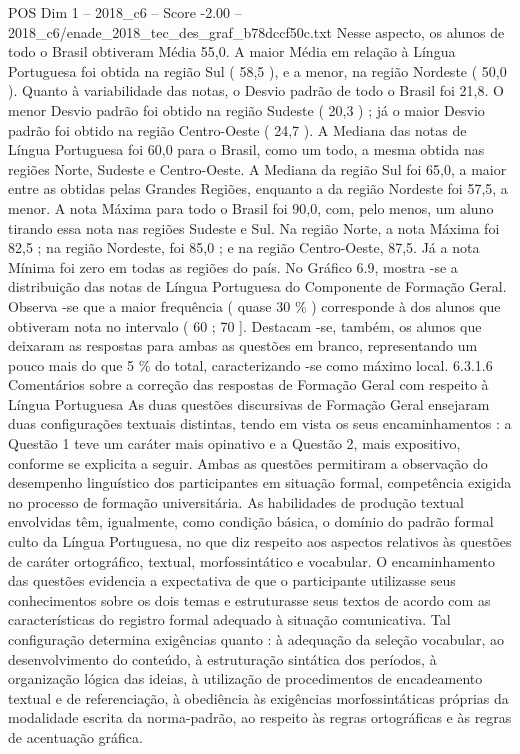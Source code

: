 \begin{textsample}{POS Dim 1 – 2018\_c6 – Score -2.00 – 2018\_c6/enade\_2018\_tec\_des\_graf\_b78dccf50c.txt}
Nesse aspecto, os alunos de todo o Brasil obtiveram Média 55,0.
A maior Média em relação à Língua Portuguesa foi obtida na região Sul ( 58,5 ), e a menor, na região Nordeste ( 50,0 ).
Quanto à variabilidade das notas, o Desvio padrão de todo o Brasil foi 21,8.
O menor Desvio padrão foi obtido na região Sudeste ( 20,3 ) ; já o maior Desvio padrão foi obtido na região Centro-Oeste ( 24,7 ).
A Mediana das notas de Língua Portuguesa foi 60,0 para o Brasil, como um todo, a mesma obtida nas regiões Norte, Sudeste e Centro-Oeste.
A Mediana da região Sul foi 65,0, a maior entre as obtidas pelas Grandes Regiões, enquanto a da região Nordeste foi 57,5, a menor.
A nota Máxima para todo o Brasil foi 90,0, com, pelo menos, um aluno tirando essa nota nas regiões Sudeste e Sul.
Na região Norte, a nota Máxima foi 82,5 ; na região Nordeste, foi 85,0 ; e na região Centro-Oeste, 87,5.
Já a nota Mínima foi zero em todas as regiões do país.
No Gráfico 6.9, mostra -se a distribuição das notas de Língua Portuguesa do Componente de Formação Geral.
Observa -se que a maior frequência ( quase 30 \% ) corresponde à dos alunos que obtiveram nota no intervalo ( 60 ; 70 ].
Destacam -se, também, os alunos que deixaram as respostas para ambas as questões em branco, representando um pouco mais do que 5 \% do total, caracterizando -se como máximo local. 6.3.1.6 Comentários sobre a correção das respostas de Formação Geral com respeito à Língua Portuguesa As duas questões discursivas de Formação Geral ensejaram duas configurações textuais distintas, tendo em vista os seus encaminhamentos : a Questão 1 teve um caráter mais opinativo e a Questão 2, mais expositivo, conforme se explicita a seguir.
Ambas as questões permitiram a observação do desempenho linguístico dos participantes em situação formal, competência exigida no processo de formação universitária.
As habilidades de produção textual envolvidas têm, igualmente, como condição básica, o domínio do padrão formal culto da Língua Portuguesa, no que diz respeito aos aspectos relativos às questões de caráter ortográfico, textual, morfossintático e vocabular.
O encaminhamento das questões evidencia a expectativa de que o participante utilizasse seus conhecimentos sobre os dois temas e estruturasse seus textos de acordo com as características do registro formal adequado à situação comunicativa.
Tal configuração determina exigências quanto : à adequação da seleção vocabular, ao desenvolvimento do conteúdo, à estruturação sintática dos períodos, à organização lógica das ideias, à utilização de procedimentos de encadeamento textual e de referenciação, à obediência às exigências morfossintáticas próprias da modalidade escrita da norma-padrão, ao respeito às regras ortográficas e às regras de acentuação gráfica.

\end{textsample}
